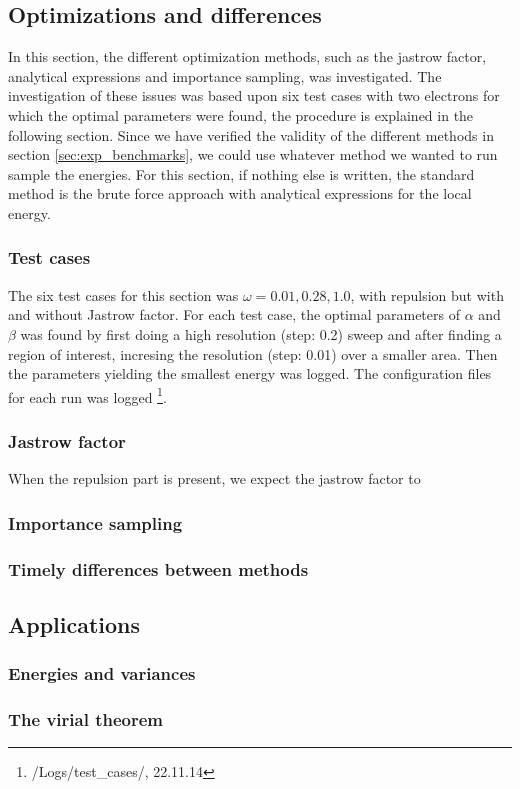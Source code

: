 \subsection{Optimizations and differences} \label{sec:exp_opt_and_diff}

In this section, the different optimization methods, such as the jastrow factor, analytical expressions and importance sampling, was investigated. 
The investigation of these issues was based upon six test cases with two electrons for which the optimal parameters were found, the procedure is explained in the following section.
Since we have verified the validity of the different methods in section \ref{sec:exp_benchmarks}, we could use whatever method we wanted to run sample the energies. 
For this section, if nothing else is written, the standard method is the brute force approach with analytical expressions for the local energy. 

\subsubsection{Test cases}

The six test cases for this section was $\omega = 0.01, 0.28, 1.0$, with repulsion but with and without Jastrow factor.
For each test case, the optimal parameters of $\alpha$ and $\beta$ was found by first doing a high resolution (step: 0.2) sweep and after finding a region of interest, incresing the resolution (step: 0.01) over a smaller area. 
Then the parameters yielding the smallest energy was logged. 
The configuration files for each run was logged \footnote{/Logs/test\_cases/, 22.11.14}. 

\subsubsection{Jastrow factor}

When the repulsion part is present, we expect the jastrow factor to 

\subsubsection{Importance sampling}

\subsubsection{Timely differences between methods}



















\subsection{Applications}

\subsubsection{Energies and variances}

\subsubsection{The virial theorem }